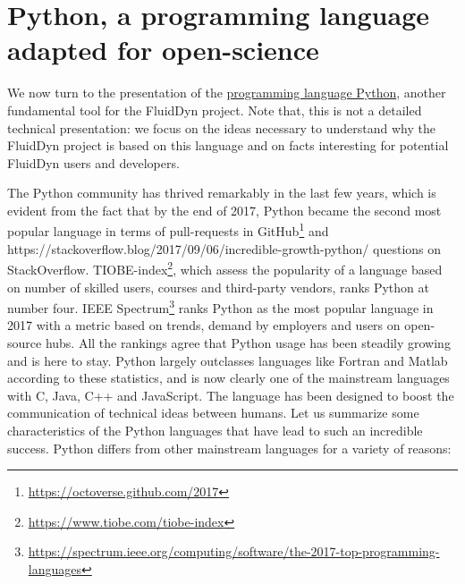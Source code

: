 \section{Python, a programming language adapted for open-science}

We now turn to the presentation of the
\href{https://www.python.org/}{programming language Python}, another
fundamental tool for the FluidDyn project. Note that, this is not a detailed
technical presentation: we focus on the ideas necessary to understand why the
FluidDyn project is based on this language and on facts interesting for
potential FluidDyn users and developers.

The Python community has thrived remarkably in the last few years, which is
evident from the fact that by the end of 2017, Python became the second most
popular language in terms of pull-requests in GitHub\footnote{%
\url{https://octoverse.github.com/2017}
%
} and
\fnref%
{https://stackoverflow.blog/2017/09/06/incredible-growth-python/}%
{questions on StackOverflow}.
%
TIOBE-index\footnote{\url{https://www.tiobe.com/tiobe-index}}, which assess the
popularity of a language based on number of skilled users, courses and
third-party vendors, ranks Python at number four. IEEE Spectrum\footnote{
\url{https://spectrum.ieee.org/computing/software/the-2017-top-programming-languages}
}
ranks Python as the most popular language in 2017 with a metric
based on trends, demand by employers and users on open-source hubs.  All the
rankings agree that Python usage has been steadily growing and is here to stay.
Python largely outclasses languages like Fortran and Matlab according to these
statistics, and is now clearly one of the mainstream languages with C, Java,
C++ and JavaScript.
%
The language has been designed to boost the communication of technical ideas
between humans. 
%
Let us summarize some characteristics of the Python languages that have lead to
such an incredible success.
%
Python differs from other mainstream languages for a variety of reasons:


